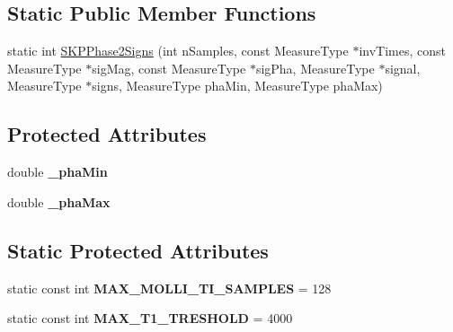 \subsection*{Static Public Member Functions}
\begin{DoxyCompactItemize}
\item 
static int \hyperlink{class_ox_1_1_sign_calculator_shmolli_a281487db14afd7142d0a9439fd8d319d}{S\-K\-P\-Phase2\-Signs} (int n\-Samples, const Measure\-Type $\ast$inv\-Times, const Measure\-Type $\ast$sig\-Mag, const Measure\-Type $\ast$sig\-Pha, Measure\-Type $\ast$signal, Measure\-Type $\ast$signs, Measure\-Type pha\-Min, Measure\-Type pha\-Max)
\end{DoxyCompactItemize}
\subsection*{Protected Attributes}
\begin{DoxyCompactItemize}
\item 
\hypertarget{class_ox_1_1_sign_calculator_shmolli_a3384cfa4793a5a6e9e6285d70b3131be}{double {\bfseries \-\_\-pha\-Min}}\label{class_ox_1_1_sign_calculator_shmolli_a3384cfa4793a5a6e9e6285d70b3131be}

\item 
\hypertarget{class_ox_1_1_sign_calculator_shmolli_a1b17399c7a9c9a30dd2fcb9a09db3ae8}{double {\bfseries \-\_\-pha\-Max}}\label{class_ox_1_1_sign_calculator_shmolli_a1b17399c7a9c9a30dd2fcb9a09db3ae8}

\end{DoxyCompactItemize}
\subsection*{Static Protected Attributes}
\begin{DoxyCompactItemize}
\item 
\hypertarget{class_ox_1_1_sign_calculator_shmolli_a885834272c7d64afc5faae54fce33e8b}{static const int {\bfseries M\-A\-X\-\_\-\-M\-O\-L\-L\-I\-\_\-\-T\-I\-\_\-\-S\-A\-M\-P\-L\-E\-S} = 128}\label{class_ox_1_1_sign_calculator_shmolli_a885834272c7d64afc5faae54fce33e8b}

\item 
\hypertarget{class_ox_1_1_sign_calculator_shmolli_a6540643a5e432b753b631a5abc7b0619}{static const int {\bfseries M\-A\-X\-\_\-\-T1\-\_\-\-T\-R\-E\-S\-H\-O\-L\-D} = 4000}\label{class_ox_1_1_sign_calculator_shmolli_a6540643a5e432b753b631a5abc7b0619}

\end{DoxyCompactItemize}


